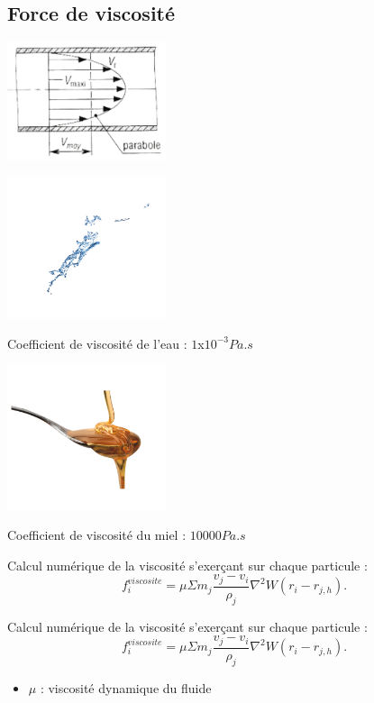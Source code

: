 \documentclass{article}
\begin{document}
\subsection{Force de viscosité}
\parbox{0.34\textwidth}{
    \includegraphics[width=0.35\textwidth]{visco.png}
}
\parbox{0.33\textwidth}{
\includegraphics[width=0.35\textwidth]{visco_eau.png}
\vspace*{2pt}
\begin{center}
    Coefficient de viscosité de l’eau : 
    $1$x$10^{-3} Pa.s$
\end{center}
}
\parbox{0.33\textwidth}{
\includegraphics[width=0.35\textwidth]{visco_miel.png}
\vspace*{2pt}
\begin{center}
    Coefficient de viscosité du miel : 
    $10000 Pa.s$
\end{center}
}

\newpage
\vspace*{2pt}
\thispagestyle{landscape}
Calcul numérique de la viscosité s’exerçant sur chaque particule :
$$ f^{viscosite}_i = \mu \Sigma m_j \frac{v_j-v_i}{\rho_j} \nabla ^2 W(r_i- r_{j,h}).$$

\newpage
\vspace*{2pt}
\thispagestyle{landscape}
Calcul numérique de la viscosité s’exerçant sur chaque particule :
$$ f^{viscosite}_i = \mu \Sigma m_j \frac{v_j-v_i}{\rho_j} \nabla ^2 W(r_i- r_{j,h}).$$
\begin{itemize}
    \item $\mu$ : viscosité dynamique du fluide 
\end{itemize}
\end{document}
